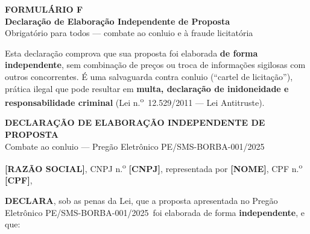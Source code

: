 \documentclass[12pt,a4paper]{article}
\newcommand{\formulario}[3]{%
  \clearpage
  \begin{tcolorbox}[enhanced,colback=navy,colframe=navy,arc=6pt,
    left=14pt,right=14pt,top=10pt,bottom=10pt]
    \color{white}
    {\large\bfseries FORMULÁRIO #1}\\[4pt]
    {\Large\bfseries #2}\\[4pt]
    {\small\color{ltblue} #3}
  \end{tcolorbox}
  \vspace{0.3cm}}
\newcommand{\editalRef}{PE/SMS-BORBA-001/2025}
\begin{document}
\formulario{F}{Declaração de Elaboração Independente de Proposta}{%
  Obrigatório para todos --- combate ao conluio e à fraude licitatória}

\begin{dicabox}
\small
Esta declaração comprova que sua proposta foi elaborada \textbf{de forma
independente}, sem combinação de preços ou troca de informações sigilosas com
outros concorrentes. É uma salvaguarda contra conluio (``cartel de licitação''),
prática ilegal que pode resultar em \textbf{multa, declaração de inidoneidade
e responsabilidade criminal} (Lei n.\textsuperscript{o}~12.529/2011 ---
Lei Antitruste).
\end{dicabox}

\vspace{0.3cm}
\begin{fillbox}
\begin{center}
  {\bfseries\color{navy}DECLARAÇÃO DE ELABORAÇÃO INDEPENDENTE DE PROPOSTA}\\[4pt]
  {\small Combate ao conluio --- Pregão Eletrônico \editalRef}
\end{center}
\end{fillbox}

\bigskip
\noindent\textbf{[RAZÃO SOCIAL]}, CNPJ n.\textsuperscript{o} \textbf{[CNPJ]},
representada por \textbf{[NOME]}, CPF n.\textsuperscript{o} \textbf{[CPF]},

\bigskip
\noindent\textbf{DECLARA}, sob as penas da Lei, que a proposta apresentada no
Pregão Eletrônico \editalRef\ foi elaborada de forma \textbf{independente},
e que:
\end{document}
